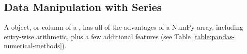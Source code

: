 \begin{comment}
\begin{problem}
Create a pandas \li{Series} where the index labels are the even integers $0,2,\ldots,50$, and the entries are $n^2 - 1$, where $n$ is the entry's label.
Set all of the entries equal to zero whose labels are divisible by $3$.
\end{problem}
\end{comment}

\subsection*{Data Manipulation with Series} %

A  object, or column of a , has all of the advantages of a NumPy array, including entry-wise arithmetic, plus a few additional features (see Table \ref{table:pandas-numerical-methods}).

